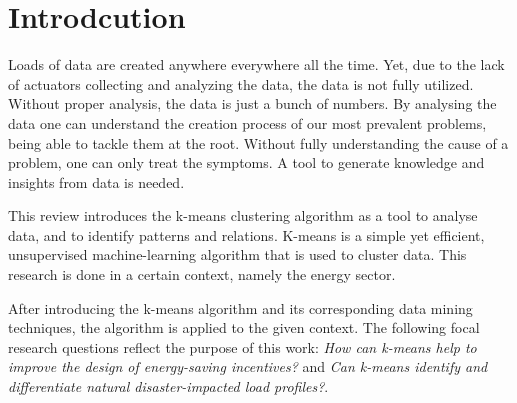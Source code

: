 \chapter{Introdcution}
\label{cha:introduction}


Loads of data are created anywhere everywhere all the time.
Yet, due to the lack of actuators collecting and analyzing the data, the data is not fully utilized.
Without proper analysis, the data is just a bunch of numbers.
By analysing the data one can understand the creation process of our most prevalent problems, being able to tackle them at the root.
Without fully understanding the cause of a problem, one can only treat the symptoms.
A tool to generate knowledge and insights from data is needed.

This review introduces the k-means clustering algorithm as a tool to analyse data, and to identify patterns and relations.
K-means is a simple yet efficient, unsupervised machine-learning algorithm that is used to cluster data.
This research is done in a certain context, namely the energy sector.

After introducing the k-means algorithm and its corresponding data mining techniques, the algorithm is applied to the given context.
The following focal research questions reflect the purpose of this work:
\textit{How can k-means help to improve the design of energy-saving incentives?} and \textit{Can k-means identify and differentiate natural disaster-impacted load profiles?}.

